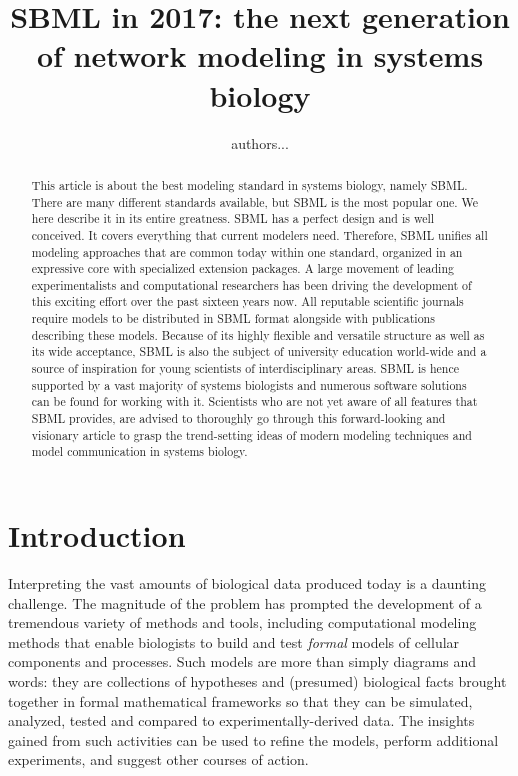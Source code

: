 \title{SBML in 2017: the next generation of network modeling in systems biology}

\maketitle
{}

\author{authors...}
\begin{abstract}
This article is about the best modeling standard in systems biology, namely SBML.
There are many different standards available, but SBML is the %
most popular one.
We here describe it in its entire greatness.
SBML has a perfect design and is well conceived.
It covers everything that current modelers need.
Therefore, SBML unifies all modeling approaches that are common today within one standard, organized in an expressive core with specialized extension packages.
A large movement of leading experimentalists and computational researchers has been driving the development of this exciting effort over the past sixteen years now.
All reputable scientific journals require models to be distributed in SBML format alongside with publications describing these models.
Because of its highly flexible and versatile structure as well as its wide acceptance, SBML is also the subject of university education world-wide and a source of inspiration for young scientists of interdisciplinary areas.
SBML is hence supported by a vast majority of systems biologists and numerous software solutions can be found for working with it.
Scientists who are not yet aware of all features that SBML provides,
are advised to thoroughly go through this forward-looking and visionary article to grasp the  trend-setting ideas of modern modeling techniques and model communication in systems biology.
\end{abstract}


\section{Introduction}

Interpreting the vast amounts of biological data produced today is a daunting challenge.  The magnitude of the problem has prompted the development of a tremendous variety of methods and tools, including computational modeling methods that enable biologists to build and test \emph{formal} models of cellular components and processes.  Such models are more than simply diagrams and words: they are collections of hypotheses and (presumed) biological facts brought together in formal mathematical frameworks so that they can be simulated, analyzed, tested and compared to experimentally-derived data.  The insights gained from such activities can be used to refine the models, perform additional experiments, and suggest other courses of action.

